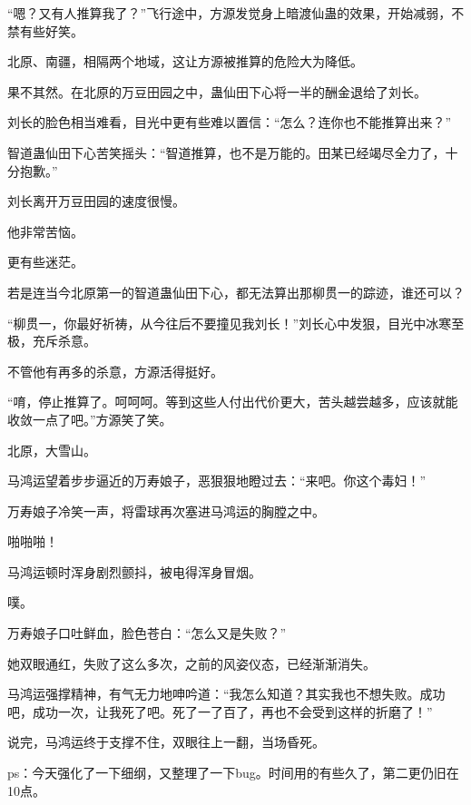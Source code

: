 \begin{this_body}
“嗯？又有人推算我了？”飞行途中，方源发觉身上暗渡仙蛊的效果，开始减弱，不禁有些好笑。

北原、南疆，相隔两个地域，这让方源被推算的危险大为降低。

果不其然。在北原的万豆田园之中，蛊仙田下心将一半的酬金退给了刘长。

刘长的脸色相当难看，目光中更有些难以置信：“怎么？连你也不能推算出来？”

智道蛊仙田下心苦笑摇头：“智道推算，也不是万能的。田某已经竭尽全力了，十分抱歉。”

刘长离开万豆田园的速度很慢。

他非常苦恼。

更有些迷茫。

若是连当今北原第一的智道蛊仙田下心，都无法算出那柳贯一的踪迹，谁还可以？

“柳贯一，你最好祈祷，从今往后不要撞见我刘长！”刘长心中发狠，目光中冰寒至极，充斥杀意。

不管他有再多的杀意，方源活得挺好。

“唷，停止推算了。呵呵呵。等到这些人付出代价更大，苦头越尝越多，应该就能收敛一点了吧。”方源笑了笑。

北原，大雪山。

马鸿运望着步步逼近的万寿娘子，恶狠狠地瞪过去：“来吧。你这个毒妇！”

万寿娘子冷笑一声，将雷球再次塞进马鸿运的胸膛之中。

啪啪啪！

马鸿运顿时浑身剧烈颤抖，被电得浑身冒烟。

噗。

万寿娘子口吐鲜血，脸色苍白：“怎么又是失败？”

她双眼通红，失败了这么多次，之前的风姿仪态，已经渐渐消失。

马鸿运强撑精神，有气无力地呻吟道：“我怎么知道？其实我也不想失败。成功吧，成功一次，让我死了吧。死了一了百了，再也不会受到这样的折磨了！”

说完，马鸿运终于支撑不住，双眼往上一翻，当场昏死。

ps：今天强化了一下细纲，又整理了一下bug。时间用的有些久了，第二更仍旧在10点。

\end{this_body}

